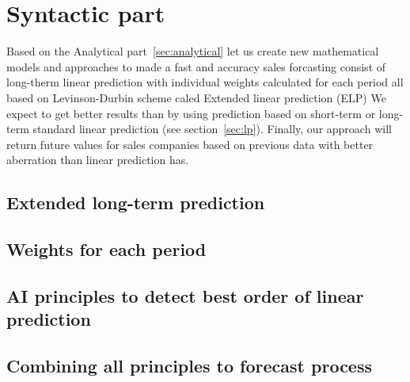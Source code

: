 \chapter{Syntactic part} \label{sec:syntactic}
Based on the Analytical part~\ref{sec:analytical} let us create new mathematical models and approaches to made a fast and accuracy sales forcasting
consist of long-therm linear prediction with individual weights calculated for each period all based on Levinson-Durbin scheme caled Extended linear prediction (ELP)
We expect to get better results than by using prediction based on short-term or long-term standard linear prediction (see section~\ref{sec:lp}).
Finally, our approach will return future values for sales companies based on previous data with better aberration than linear prediction has.
\section{Extended long-term prediction} \label{sec:extlonglp}
\section{Weights for each period} \label{sec:weights}
\section{AI principles to detect best order of linear prediction} \label{sec:aiprincipoles}
\section{Combining all principles to forecast process} \label{subsec:combining_models}
